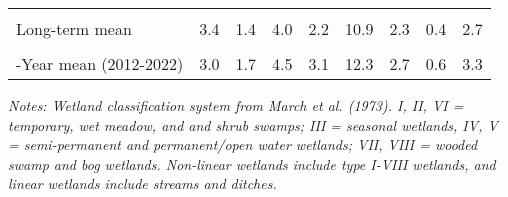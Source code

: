 \documentclass[
  12pt,
]{article}
\begin{document}
\begin{table}[!h]
{\begin{threeparttable}
\begin{tabular}[t]{>{\centering\arraybackslash}m{8em}cccccccc}
\cellcolor{gray!6}{\% Change from previous year} & \cellcolor{gray!6}{131.6\%} & \cellcolor{gray!6}{200.9\%} & \cellcolor{gray!6}{-11.5\%} & \cellcolor{gray!6}{116.2\%} & \cellcolor{gray!6}{70.1\%} & \cellcolor{gray!6}{49.4\%} & \cellcolor{gray!6}{303.0\%} & \cellcolor{gray!6}{73.5\%}\\
Long-term mean & 3.4 & 1.4 & 4.0 & 2.2 & 10.9 & 2.3 & 0.4 & 2.7\\
\cellcolor{gray!6}{\% Change from long-term mean} & \cellcolor{gray!6}{-4.7\%} & \cellcolor{gray!6}{145.7\%} & \cellcolor{gray!6}{27.0\%} & \cellcolor{gray!6}{425.8\%} & \cellcolor{gray!6}{110.6\%} & \cellcolor{gray!6}{109.8\%} & \cellcolor{gray!6}{210.4\%} & \cellcolor{gray!6}{125.9\%}\\
10-Year mean (2012-2022) & 3.0 & 1.7 & 4.5 & 3.1 & 12.3 & 2.7 & 0.6 & 3.3\\
\bottomrule
\end{tabular}
\begin{tablenotes}
\small
\item \textit{Notes: Wetland classification system from March et al. (1973). 
      I, II, VI = temporary, wet meadow, and and shrub swamps; III = seasonal wetlands, IV, V = semi-permanent 
      and permanent/open water wetlands; VII, VIII = wooded swamp and bog wetlands. Non-linear wetlands include
      type I-VIII wetlands, and linear wetlands include streams and ditches.} 
\item 
\end{tablenotes}
\end{threeparttable}}
\end{table}

\newpage
\end{document}
